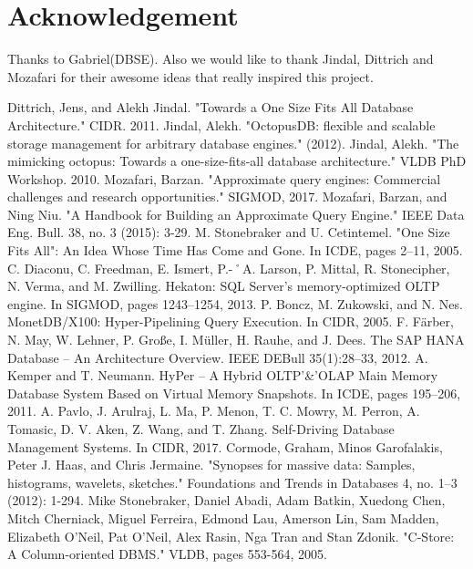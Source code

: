 \documentclass[10pt, conference, compsocconf]{IEEEtran}
\begin{document}
\section*{Acknowledgement}
Thanks to Gabriel(DBSE). Also we would like to thank Jindal, Dittrich and Mozafari for their awesome ideas that really inspired this project.

\begin{thebibliography}{1}

Dittrich, Jens, and Alekh Jindal. "Towards a One Size Fits All Database Architecture." CIDR. 2011.
Jindal, Alekh. "OctopusDB: flexible and scalable storage management for arbitrary database engines." (2012).
Jindal, Alekh. "The mimicking octopus: Towards a one-size-fits-all database architecture." VLDB PhD Workshop. 2010.
Mozafari, Barzan. "Approximate query engines: Commercial challenges and research opportunities." SIGMOD, 2017.
Mozafari, Barzan, and Ning Niu. "A Handbook for Building an Approximate Query Engine." IEEE Data Eng.
Bull. 38, no. 3 (2015): 3-29.
M. Stonebraker and U. Cetintemel. "One Size Fits All": An Idea Whose Time Has Come and Gone. In ICDE, pages 2–11, 2005.
C. Diaconu, C. Freedman, E. Ismert, P.-˚A. Larson, P. Mittal, R. Stonecipher, N. Verma, and M. Zwilling. Hekaton: SQL Server’s memory-optimized OLTP engine. In SIGMOD, pages 1243–1254, 2013.
P. Boncz, M. Zukowski, and N. Nes. MonetDB/X100: Hyper-Pipelining Query Execution. In CIDR, 2005.
F. Färber, N. May, W. Lehner, P. Große, I. Müller, H. Rauhe, and J. Dees. The SAP HANA Database – An Architecture Overview. IEEE DEBull 35(1):28–33, 2012.
A. Kemper and T. Neumann. HyPer – A Hybrid OLTP'\&'OLAP Main Memory Database System Based on Virtual Memory Snapshots. In ICDE, pages 195–206, 2011.
A. Pavlo, J. Arulraj, L. Ma, P. Menon, T. C. Mowry, M. Perron, A. Tomasic, D. V. Aken, Z. Wang, and T. Zhang. Self-Driving Database Management Systems. In CIDR, 2017.
Cormode, Graham, Minos Garofalakis, Peter J. Haas, and Chris Jermaine. "Synopses for massive data: Samples, histograms, wavelets, sketches." Foundations and Trends in Databases 4, no. 1–3 (2012): 1-294.
Mike Stonebraker, Daniel Abadi, Adam Batkin, Xuedong Chen, Mitch Cherniack, Miguel Ferreira, Edmond Lau, Amerson Lin, Sam Madden, Elizabeth O'Neil, Pat O'Neil, Alex Rasin, Nga Tran and Stan Zdonik. "C-Store: A Column-oriented DBMS." VLDB, pages 553-564, 2005. 

\end{thebibliography}
\end{document}
